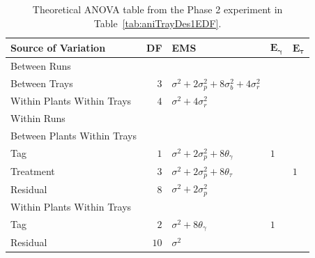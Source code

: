 \begin{table}[!ht]
\centering
 \caption{Theoretical ANOVA table from the Phase 2 experiment in Table~\ref{tab:aniTrayDes1EDF}.}
 \begin{tabular}[t]{lrlll} 
 \toprule 
 \multicolumn{1}{l}{\textbf{Source of Variation}} & \multicolumn{1}{l}{\textbf{DF}} & \multicolumn{1}{l}{\textbf{EMS}}& \multicolumn{1}{l}{$\bm{E_{\gamma}}$}&\multicolumn{1}{l}{$\bm{E_{\tau}}$}\\ 
 \midrule 
 Between Runs &  &  & & \\ 
 \quad Between Trays & $3$ & $\sigma^2+2\sigma_{p}^2+8\sigma_{b}^2+4\sigma_{r}^2$ & & \\  
 \quad Within Plants Within Trays & $4$ & $\sigma^2+4\sigma_{r}^2$ & & \\ \hline 
 Within Runs &  &  & & \\ 
 \quad Between Plants Within Trays &  &  & & \\ 
 \quad \quad Tag & $1$ & $\sigma^2+2\sigma_{p}^2+8\theta_{\gamma}$ &$1$ & \\ 
 \quad \quad Treatment & $3$ & $\sigma^2+2\sigma_{p}^2+8\theta_{\tau}$ & & $1$\\ 
 \quad \quad Residual & $8$ & $\sigma^2+2\sigma_{p}^2$ & & \\ \hline 
 \quad Within Plants Within Trays &  &  & & \\ 
 \quad \quad Tag & $2$ & $\sigma^2+8\theta_{\gamma}$ &$1$ & \\ 
 \quad \quad Residual & $10$ & $\sigma^2$ & & \\ 
 \bottomrule 
 \end{tabular} 
 \label{tab:ANOVAPhase1RCBD1} 


\end{table}
